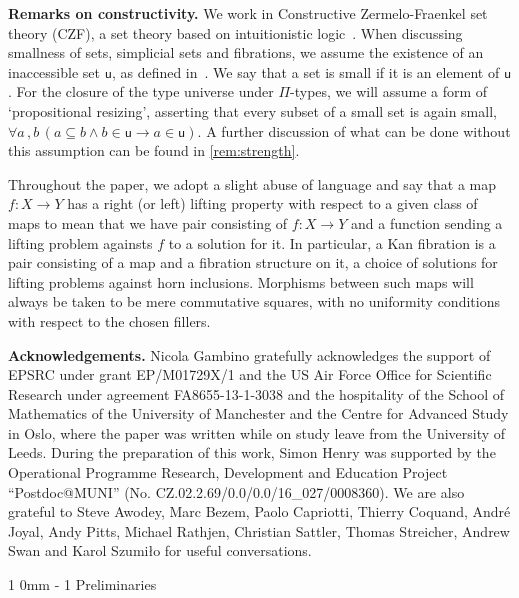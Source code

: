 \documentclass[reqno,10pt,a4paper,oneside,draft]{amsart}
\makeatletter
\renewcommand{\section}{\@startsection
{section}%
{1}%
{0mm}%
{-\baselineskip}%
{1\baselineskip}%
{\Large \bfseries}}%
\numberwithin{equation}{section}
\theoremstyle{mythm}
\theoremstyle{mydef}
\theoremstyle{myrmk}
\newcommand{\ie}{\text{i.e.\ }}
\newcommand{\co}{\colon}
\makeatother
\begin{document}
\smallskip

\noindent
\textbf{Remarks on constructivity.} We work in  Constructive Zermelo-Fraenkel set theory (CZF),
a set theory based on intuitionistic logic~\cite{AczelP:typtic-I}. When discussing smallness of sets,
simplicial sets and fibrations, we assume the existence of an inaccessible set $\mathsf{u}$, as defined 
in~\cite[Definition~18.1.2]{AczelP:notcst}. We say that a set is small if it is an element of $\mathsf{u}$.
For the closure of the type universe under $\Pi$-types, we will assume a form of `propositional resizing', asserting that every subset 
of a small set is again small, \ie  $\forall a \, , b \,  ( a \subseteq b \land b \in \mathsf{u} \rightarrow a \in \mathsf{u} )$.  A further discussion of what can be done without this assumption can be found in \cref{rem:strength}. 

Throughout the paper, we adopt a slight abuse of language and say that a map $f \co X \to Y$ has a right (or left) lifting property with respect to a given 
class of maps to mean that we have pair consisting of $f \co X \to Y$ and a function sending a lifting problem againsts $f$ to a solution
for it. In particular,  a Kan fibration is a pair consisting of a map and a fibration structure on it, \ie a choice of solutions for lifting problems against horn inclusions. Morphisms between such maps will always be taken to be mere commutative squares, with no uniformity conditions with respect to the chosen fillers.


\smallskip

\noindent 
\textbf{Acknowledgements.} Nicola Gambino gratefully acknowledges the support of
EPSRC under grant EP/M01729X/1 and the US Air Force Office for Scientific Research under 
agreement FA8655-13-1-3038 and the hospitality of the 
School of Mathematics of the University of Manchester and the Centre for Advanced Study in Oslo,
where the paper was written while on study leave from the University of Leeds. During the preparation of this work, Simon Henry was supported by the Operational Programme Research, Development and Education Project ``Postdoc@MUNI'' (No. CZ.02.2.69/0.0/0.0/16\_027/0008360). We are also grateful to Steve Awodey, Marc Bezem, Paolo Capriotti, Thierry Coquand, Andr\'e Joyal, Andy Pitts, Michael Rathjen, Christian Sattler, Thomas Streicher, Andrew Swan and Karol Szumi{\l}o  for useful conversations. 






\section{Preliminaries} 
\label{sec:preliminaries}
\end{document}
